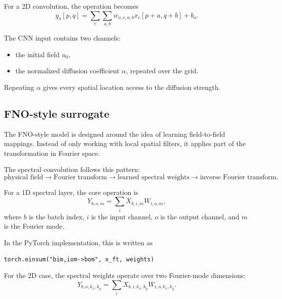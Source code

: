 \documentclass[11pt,a4paper]{article}
\begin{document}
For a 2D convolution, the operation becomes
\begin{equation}
    y_o[p,q]
    =
    \sum_c
    \sum_{a,b}
    w_{o,c,a,b}
    x_c[p+a,q+b]
    +
    b_o.
\end{equation}

The CNN input contains two channels:
\begin{itemize}[leftmargin=*]
    \item the initial field \(u_0\),
    \item the normalized diffusion coefficient \(\alpha\), repeated over the grid.
\end{itemize}

Repeating \(\alpha\) gives every spatial location access to the diffusion strength.

\subsection{FNO-style surrogate}

The FNO-style model is designed around the idea of learning field-to-field mappings. Instead of only working with local spatial filters, it applies part of the transformation in Fourier space.

The spectral convolution follows this pattern:
\begin{equation}
    \text{physical field}
    \rightarrow
    \text{Fourier transform}
    \rightarrow
    \text{learned spectral weights}
    \rightarrow
    \text{inverse Fourier transform}.
\end{equation}

For a 1D spectral layer, the core operation is
\begin{equation}
    Y_{b,o,m}
    =
    \sum_i
    X_{b,i,m}
    W_{i,o,m},
    \label{eq:fno_1d}
\end{equation}
where \(b\) is the batch index, \(i\) is the input channel, \(o\) is the output channel, and \(m\) is the Fourier mode.

In the PyTorch implementation, this is written as
\begin{verbatim}
torch.einsum("bim,iom->bom", x_ft, weights)
\end{verbatim}

For the 2D case, the spectral weights operate over two Fourier-mode dimensions:
\begin{equation}
    Y_{b,o,k_x,k_y}
    =
    \sum_i
    X_{b,i,k_x,k_y}
    W_{i,o,k_x,k_y}.
    \label{eq:fno_2d}
\end{equation}
\end{document}
